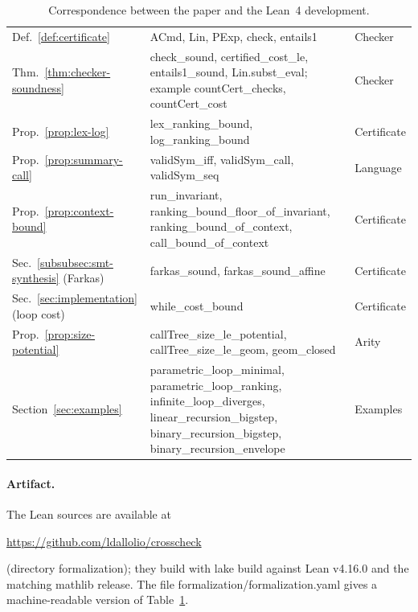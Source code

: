 \documentclass[oneside,english]{amsart}
\numberwithin{equation}{section}
\numberwithin{figure}{section}
\theoremstyle{plain}
\theoremstyle{definition}
\theoremstyle{plain}
\theoremstyle{remark}
\theoremstyle{plain}
\theoremstyle{definition}
\theoremstyle{plain}
\theoremstyle{remark}
\newcommand{\lean}[1]{{\ttfamily\small #1}}
\begin{document}
\begin{table}[ht]
\begin{tabular}{@{}>{\raggedright\arraybackslash}p{}>{\raggedright\arraybackslash}p{}>{\raggedright\arraybackslash}p{}@{}}
Def.~\ref{def:certificate} & \lean{ACmd}, \lean{Lin}, \lean{PExp}, \lean{check}, \lean{entails1} & \lean{Checker} \\
Thm.~\ref{thm:checker-soundness} & \lean{check\_\allowbreak sound}, \lean{certified\_\allowbreak cost\_\allowbreak le}, \lean{entails1\_\allowbreak sound}, \lean{Lin.subst\_\allowbreak eval}; example \lean{countCert\_\allowbreak checks}, \lean{countCert\_\allowbreak cost} & \lean{Checker} \\
Prop.~\ref{prop:lex-log} & \lean{lex\_\allowbreak ranking\_\allowbreak bound}, \lean{log\_\allowbreak ranking\_\allowbreak bound} & \lean{Certificate} \\
Prop.~\ref{prop:summary-call} & \lean{validSym\_\allowbreak iff}, \lean{validSym\_\allowbreak call}, \lean{validSym\_\allowbreak seq} & \lean{Language} \\
Prop.~\ref{prop:context-bound} & \lean{run\_\allowbreak invariant}, \lean{ranking\_\allowbreak bound\_\allowbreak floor\_\allowbreak of\_\allowbreak invariant}, \lean{ranking\_\allowbreak bound\_\allowbreak of\_\allowbreak context}, \lean{call\_\allowbreak bound\_\allowbreak of\_\allowbreak context} & \lean{Certificate} \\
Sec.~\ref{subsubsec:smt-synthesis} (Farkas) & \lean{farkas\_\allowbreak sound}, \lean{farkas\_\allowbreak sound\_\allowbreak affine} & \lean{Certificate} \\
Sec.~\ref{sec:implementation} (loop cost) & \lean{while\_\allowbreak cost\_\allowbreak bound} & \lean{Certificate} \\
Prop.~\ref{prop:size-potential} & \lean{callTree\_\allowbreak size\_\allowbreak le\_\allowbreak potential}, \lean{callTree\_\allowbreak size\_\allowbreak le\_\allowbreak geom}, \lean{geom\_\allowbreak closed} & \lean{Arity} \\
Section~\ref{sec:examples} & \lean{parametric\_\allowbreak loop\_\allowbreak minimal}, \lean{parametric\_\allowbreak loop\_\allowbreak ranking}, \lean{infinite\_\allowbreak loop\_\allowbreak diverges}, \lean{linear\_\allowbreak recursion\_\allowbreak bigstep}, \lean{binary\_\allowbreak recursion\_\allowbreak bigstep}, \lean{binary\_\allowbreak recursion\_\allowbreak envelope} & \lean{Examples} \\
\bottomrule
\end{tabular}
\caption{Correspondence between the paper and the Lean~4 development.}
\label{tab:lean}
\end{table}

\paragraph{Artifact.}
The Lean sources are available at
\begin{center}\url{https://github.com/ldallolio/crosscheck}\end{center}
(directory \lean{formalization}); they build with \lean{lake build} against Lean \lean{v4.16.0} and the matching mathlib release. The file \lean{formalization/formalization.yaml} gives a machine-readable version of Table~\ref{tab:lean}.
\end{document}
